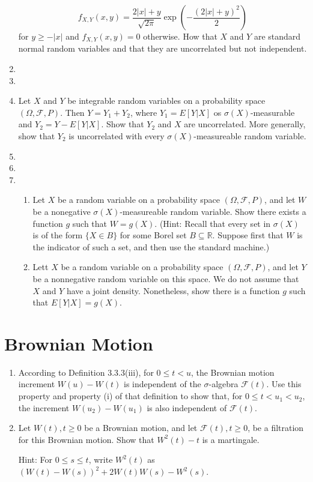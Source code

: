 \documentclass{article}
\newcommand{\F}{\mathcal{F}}
\begin{document}
\begin{enumerate}
	$$
	f_{X, Y}(x, y) = \frac{2 |x| + y}{\sqrt{2\pi}}\exp\left( - \frac{(2|x| + y)^2}{2} \right)
	$$
	for $y \geq -|x|$ and $f_{X, Y}(x, y) = 0$ otherwise. How that $X$ and $Y$ are standard normal random variables and that they are uncorrelated but not independent.
	\item 
	\item
	\item Let $X$ and $Y$ be integrable random variables on a probability space $(\Omega, \F, P)$. Then $Y = Y_1 + Y_2$, where $Y_1 = E[Y|X]$ os $\sigma(X)$-measurable and $Y_2 = Y - E[Y|X]$. Show that $Y_2$ and $X$ are uncorrelated. More generally, show that $Y_2$ is uncorrelated with every $\sigma(X)$-measureable random variable.
	\item
	\item
	\item
		\begin{enumerate}
			\item Let $X$ be a random variable on a probability space $(\Omega, \F, P)$, and let $W$ be a nonegative $\sigma(X)$-measureable random variable. Show there exists a function $g$ such that $W = g(X)$. (Hint: Recall that every set in $\sigma(X)$ is of the form $\{X \in B\}$ for some Borel set $B \subseteq \mathbb{R}$. Suppose first that $W$ is the indicator of such a set, and then use the standard machine.)
			\item Lett $X$ be a random variable on a probability space $(\Omega, \F, P)$, and let $Y$ be a nonnegative random variable on this space. We do not assume that $X$ and $Y$ have a joint density. Nonetheless, show there is a function $g$ such that $E[Y|X] = g(X)$.
		\end{enumerate}
\end{enumerate}

\section{Brownian Motion}
\begin{enumerate}
	\item According to Definition 3.3.3(iii), for $0 \leq t < u$, the Brownian motion increment $W(u) - W(t)$ is independent of the $\sigma$-algebra $\mathcal{F}(t)$. Use this property and property (i) of that definition to show that, for $0 \leq t < u_1 < u_2$, the increment $W(u_2) - W(u_1)$ is also independent of $\mathcal{F}(t)$.
	\item Let $W(t), t \geq 0$ be a Brownian motion, and let $\mathcal{F}(t), t \geq 0$, be a filtration for this Brownian motion. Show that $W^2(t) - t$ is a martingale.

	Hint: For $0 \leq s \leq t$, write $W^2(t)$ as $(W(t) - W(s))^2 + 2W(t)W(s) - W^2(s)$.
\end{enumerate}
\end{document}
